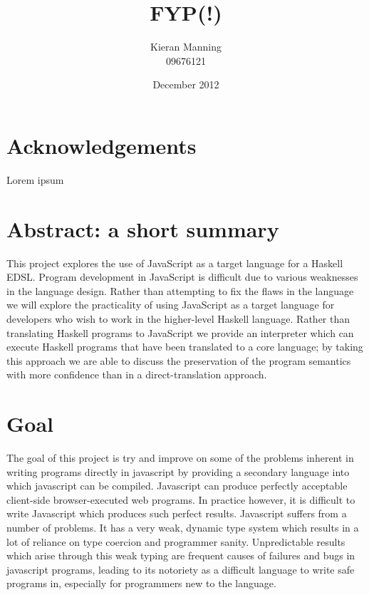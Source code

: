 \documentclass[11pt]{article}
\title{\textbf{FYP(!)}}
\author{Kieran Manning \\ 09676121}
\date{December 2012}
\begin{document}
\maketitle



\tableofcontents

\newpage

\setcounter{page}{1}

\section{Acknowledgements}
Lorem ipsum

\section{Abstract: a short summary} 
 This project explores the use of JavaScript as a target language for a Haskell EDSL. Program development in JavaScript is difficult due to various weaknesses in the language design. Rather than attempting to fix the flaws in the language we will explore the practicality of using JavaScript as a target language for developers who wish to work in the higher-level Haskell language. Rather than translating Haskell programs to JavaScript we provide an interpreter which can execute Haskell programs that have been translated to a core language; by taking this approach we are able to discuss the preservation of the program semantics with more confidence than in a direct-translation approach.


\newpage

\section{Goal}
The goal of this project is try and improve on some of the problems inherent in writing
programs directly in javascript by providing a secondary language into which javascript
can be compiled. Javascript can produce perfectly acceptable client-side browser-executed
web programs. In practice however, it is difficult to write Javascript which produces 
such perfect results. Javascript suffers from a number of problems. It has a very weak, 
dynamic type system which results in a lot of reliance on type coercion and programmer
sanity. Unpredictable results which arise through this weak typing are frequent causes
of failures and bugs in javascript programs, leading to its notoriety as a difficult 
language to write safe programs in, especially for programmers new to the language.
\end{document}
